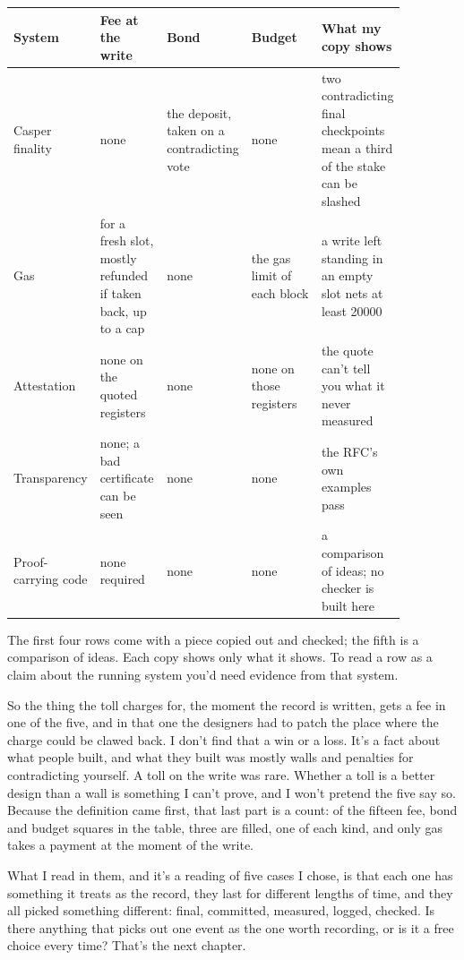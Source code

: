 \documentclass[11pt,twoside]{article}
\theoremstyle{thielethm}
\theoremstyle{thieledef}
\theoremstyle{thieledef}
\theoremstyle{thieledef}
\theoremstyle{thielethm}
\theoremstyle{thieleobs}
\theoremstyle{thielethm}
\begin{document}
\begingroup\small
\begin{longtable}{@{}>{\raggedright\arraybackslash}p{0.15\linewidth}>{\raggedright\arraybackslash}p{0.17\linewidth}>{\raggedright\arraybackslash}p{0.16\linewidth}>{\raggedright\arraybackslash}p{0.18\linewidth}>{\raggedright\arraybackslash}p{0.21\linewidth}@{}}
\toprule
\textbf{System} & \textbf{Fee at the write} & \textbf{Bond} & \textbf{Budget} & \textbf{What my copy shows} \\
\midrule
\endhead
\bottomrule
\endlastfoot
Casper finality & none & the deposit, taken on a contradicting vote & none & two contradicting final checkpoints mean a third of the stake can be slashed \\
Gas & 20000 for a fresh slot, mostly refunded if taken back, up to a cap & none & the gas limit of each block & a write left standing in an empty slot nets at least 20000 \\
Attestation & none on the quoted registers & none & none on those registers & the quote can't tell you what it never measured \\
Transparency & none; a bad certificate can be seen & none & none & the RFC's own examples pass \\
Proof-carrying code & none required & none & none & a comparison of ideas; no checker is built here \\
\end{longtable}
\endgroup

The first four rows come with a piece copied out and checked; the fifth is a comparison of ideas. Each copy shows only what it shows. To read a row as a claim about the running system you'd need evidence from that system.

So the thing the toll charges for, the moment the record is written, gets a fee in one of the five, and in that one the designers had to patch the place where the charge could be clawed back. I don't find that a win or a loss. It's a fact about what people built, and what they built was mostly walls and penalties for contradicting yourself. A toll on the write was rare. Whether a toll is a better design than a wall is something I can't prove, and I won't pretend the five say so. Because the definition came first, that last part is a count: of the fifteen fee, bond and budget squares in the table, three are filled, one of each kind, and only gas takes a payment at the moment of the write.

What I read in them, and it's a reading of five cases I chose, is that each one has something it treats as the record, they last for different lengths of time, and they all picked something different: final, committed, measured, logged, checked. Is there anything that picks out one event as the one worth recording, or is it a free choice every time? That's the next chapter.
\end{document}
